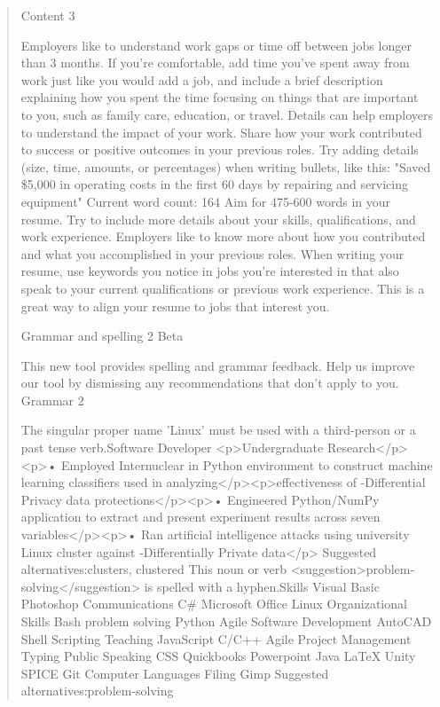 \documentclass[
	letterpaper, %
	12pt, %
]{CSSullivanBusinessReport}
\begin{document}
\begin{quote}
	Content
	3

    Employers like to understand work gaps or time off between jobs longer than 3 months. If you're comfortable, add time you've spent away from work just like you would add a job, and include a brief description explaining how you spent the time focusing on things that are important to you, such as family care, education, or travel.
    Details can help employers to understand the impact of your work. Share how your work contributed to success or positive outcomes in your previous roles. Try adding details (size, time, amounts, or percentages) when writing bullets, like this: "Saved \$5,000 in operating costs in the first 60 days by repairing and servicing equipment"
    Current word count: 164 Aim for 475-600 words in your resume. Try to include more details about your skills, qualifications, and work experience. Employers like to know more about how you contributed and what you accomplished in your previous roles. When writing your resume, use keywords you notice in jobs you're interested in that also speak to your current qualifications or previous work experience. This is a great way to align your resume to jobs that interest you.

	Grammar and spelling
	2
	Beta

	This new tool provides spelling and grammar feedback. Help us improve our tool by dismissing any recommendations that don't apply to you.
	Grammar
	2

    The singular proper name 'Linux' must be used with a third-person or a past tense verb.Software Developer <p>Undergraduate Research</p><p>• Employed Internuclear in Python environment to construct machine learning classifiers used in analyzing</p><p>effectiveness of -Differential Privacy data protections</p><p>• Engineered Python/NumPy application to extract and present experiment results across seven variables</p><p>• Ran artificial intelligence attacks using university Linux cluster against -Differentially Private data</p>
    Suggested alternatives:clusters, clustered
    This noun or verb <suggestion>problem-solving</suggestion> is spelled with a hyphen.Skills Visual Basic Photoshop Communications C\# Microsoft Office Linux Organizational Skills Bash problem solving Python Agile Software Development AutoCAD Shell Scripting Teaching JavaScript C/C++ Agile Project Management Typing Public Speaking CSS Quickbooks Powerpoint Java LaTeX Unity SPICE Git Computer Languages Filing Gimp
    Suggested alternatives:problem-solving

\end{quote}
\end{document}
